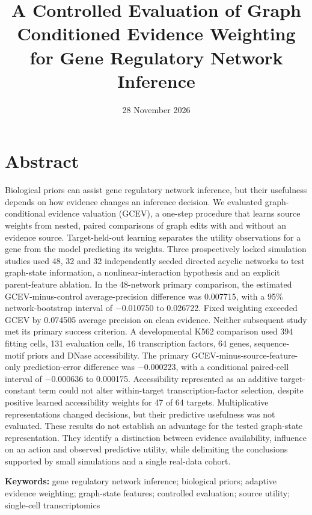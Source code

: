 \documentclass[
  11pt,
]{article}
\title{A Controlled Evaluation of Graph Conditioned Evidence Weighting
for Gene Regulatory Network Inference}
\author{}
\date{28 November 2026}
\begin{document}
\maketitle

\section{Abstract}\label{abstract}

Biological priors can assist gene regulatory network inference, but
their usefulness depends on how evidence changes an inference decision.
We evaluated graph-conditional evidence valuation (GCEV), a one-step
procedure that learns source weights from nested, paired comparisons of
graph edits with and without an evidence source. Target-held-out
learning separates the utility observations for a gene from the model
predicting its weights. Three prospectively locked simulation studies
used 48, 32 and 32 independently seeded directed acyclic networks to
test graph-state information, a nonlinear-interaction hypothesis and an
explicit parent-feature ablation. In the 48-network primary comparison,
the estimated GCEV-minus-control average-precision difference was
0.007715, with a 95\% network-bootstrap interval of −0.010750 to
0.026722. Fixed weighting exceeded GCEV by 0.074505 average precision on
clean evidence. Neither subsequent study met its primary success
criterion. A developmental K562 comparison used 394 fitting cells, 131
evaluation cells, 16 transcription factors, 64 genes, sequence-motif
priors and DNase accessibility. The primary
GCEV-minus-source-feature-only prediction-error difference was
−0.000223, with a conditional paired-cell interval of −0.000636 to
0.000175. Accessibility represented as an additive target-constant term
could not alter within-target transcription-factor selection, despite
positive learned accessibility weights for 47 of 64 targets.
Multiplicative representations changed decisions, but their predictive
usefulness was not evaluated. These results do not establish an
advantage for the tested graph-state representation. They identify a
distinction between evidence availability, influence on an action and
observed predictive utility, while delimiting the conclusions supported
by small simulations and a single real-data cohort.

\textbf{Keywords:} gene regulatory network inference; biological priors;
adaptive evidence weighting; graph-state features; controlled
evaluation; source utility; single-cell transcriptomics
\end{document}
